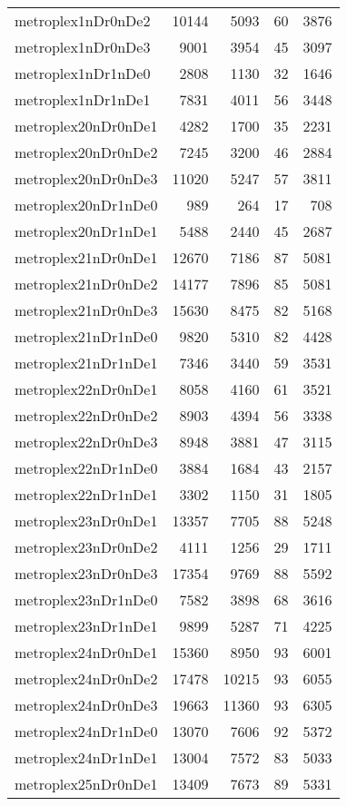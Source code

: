 \begin{longtable}{lrrrr}
metroplex1nDr0nDe2 & 10144 & 5093 & 60 & 3876 \\
metroplex1nDr0nDe3 & 9001 & 3954 & 45 & 3097 \\
metroplex1nDr1nDe0 & 2808 & 1130 & 32 & 1646 \\
metroplex1nDr1nDe1 & 7831 & 4011 & 56 & 3448 \\
metroplex20nDr0nDe1 & 4282 & 1700 & 35 & 2231 \\
metroplex20nDr0nDe2 & 7245 & 3200 & 46 & 2884 \\
metroplex20nDr0nDe3 & 11020 & 5247 & 57 & 3811 \\
metroplex20nDr1nDe0 & 989 & 264 & 17 & 708 \\
metroplex20nDr1nDe1 & 5488 & 2440 & 45 & 2687 \\
metroplex21nDr0nDe1 & 12670 & 7186 & 87 & 5081 \\
metroplex21nDr0nDe2 & 14177 & 7896 & 85 & 5081 \\
metroplex21nDr0nDe3 & 15630 & 8475 & 82 & 5168 \\
metroplex21nDr1nDe0 & 9820 & 5310 & 82 & 4428 \\
metroplex21nDr1nDe1 & 7346 & 3440 & 59 & 3531 \\
metroplex22nDr0nDe1 & 8058 & 4160 & 61 & 3521 \\
metroplex22nDr0nDe2 & 8903 & 4394 & 56 & 3338 \\
metroplex22nDr0nDe3 & 8948 & 3881 & 47 & 3115 \\
metroplex22nDr1nDe0 & 3884 & 1684 & 43 & 2157 \\
metroplex22nDr1nDe1 & 3302 & 1150 & 31 & 1805 \\
metroplex23nDr0nDe1 & 13357 & 7705 & 88 & 5248 \\
metroplex23nDr0nDe2 & 4111 & 1256 & 29 & 1711 \\
metroplex23nDr0nDe3 & 17354 & 9769 & 88 & 5592 \\
metroplex23nDr1nDe0 & 7582 & 3898 & 68 & 3616 \\
metroplex23nDr1nDe1 & 9899 & 5287 & 71 & 4225 \\
metroplex24nDr0nDe1 & 15360 & 8950 & 93 & 6001 \\
metroplex24nDr0nDe2 & 17478 & 10215 & 93 & 6055 \\
metroplex24nDr0nDe3 & 19663 & 11360 & 93 & 6305 \\
metroplex24nDr1nDe0 & 13070 & 7606 & 92 & 5372 \\
metroplex24nDr1nDe1 & 13004 & 7572 & 83 & 5033 \\
metroplex25nDr0nDe1 & 13409 & 7673 & 89 & 5331 \\

\end{longtable}
